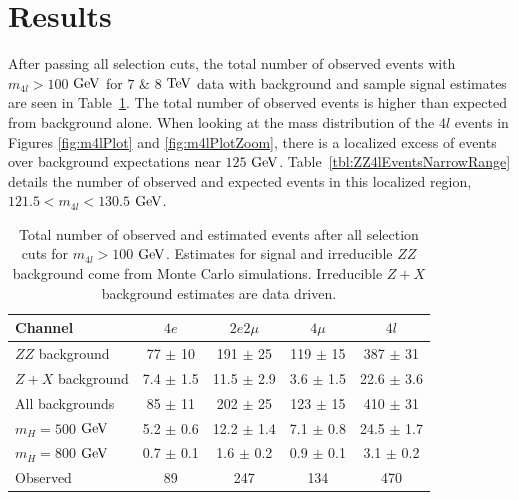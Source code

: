 \section{Results}
\label{sec:ZZ4lResults}

After passing all selection cuts, the total number of observed events with $m_{4l} > 100$ $\rm{GeV}$ for $7$ $\&$ $8$ $\rm{TeV}$ data with background and sample signal estimates are seen in Table~\ref{tbl:ZZ4lEventsFullRange}. The total number of observed events is higher than expected from background alone. When looking at the mass distribution of the $4l$ events in Figures \ref{fig:m4lPlot} and \ref{fig:m4lPlotZoom}, there is a localized excess of events over background expectations near $125$ $\rm{GeV}$. Table~\ref{tbl:ZZ4lEventsNarrowRange} details the number of observed and expected events in this localized region, $121.5 < m_{4l} < 130.5$ $\rm{GeV}$. 

\begin{table}[htbp]
\begin{center}
\begin{tabular}{l|c|c|c|c}
\hline \hline
      Channel         & $4e$ & $2e2\mu$ & $4\mu$ & $4l$  \\
      \hline
      $ZZ$ background  & 77  $\pm$ 10    &  191  $\pm$  25  & 119  $\pm$  15     &  387  $\pm$ 31\\
      $Z + X$  background & 7.4 $\pm$ 1.5   & 11.5  $\pm$ 2.9  & 3.6  $\pm$ 1.5     &  22.6 $\pm$ 3.6  \\
      \hline
      All backgrounds        & 85 $\pm$ 11     & 202  $\pm$ 25    &  123  $\pm$ 15     &  410 $\pm$ 31 \\
      \hline
      $m_H =  500$ $\rm{GeV}$ &  5.2  $\pm$  0.6  & 12.2  $\pm$  1.4 &   7.1  $\pm$  0.8  &  24.5 $\pm$ 1.7  \\
      $m_H =  800$ $\rm{GeV}$ &  0.7  $\pm$  0.1  &  1.6  $\pm$  0.2 &   0.9  $\pm$  0.1  &  3.1  $\pm$ 0.2 \\
      \hline
      Observed  & 89 & 247 & 134 & 470\\
\hline \hline
\end{tabular}
\caption[Number of Observed $4l$ Events in $100 < m_{4l} < 1000$ $\rm{GeV}$]{Total number of observed and estimated events after all selection cuts for $m_{4l} > 100$ $\rm{GeV}$. Estimates for signal and irreducible $ZZ$ background come from Monte Carlo simulations. Irreducible $Z+X$ background estimates are data driven.
\label{tbl:ZZ4lEventsFullRange}}
\end{center}
\end{table}

